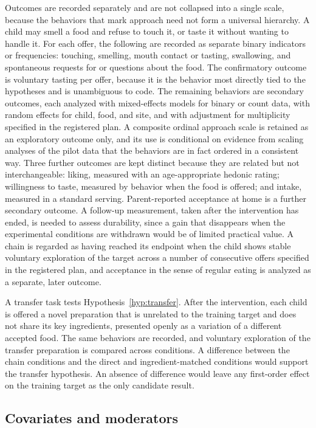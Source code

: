 \documentclass[11pt]{article}
\theoremstyle{remark}
\begin{document}
Outcomes are recorded separately and are not collapsed into a single scale, because the behaviors that mark approach need not form a universal hierarchy. A child may smell a food and refuse to touch it, or taste it without wanting to handle it. For each offer, the following are recorded as separate binary indicators or frequencies: touching, smelling, mouth contact or tasting, swallowing, and spontaneous requests for or questions about the food. The confirmatory outcome is voluntary tasting per offer, because it is the behavior most directly tied to the hypotheses and is unambiguous to code. The remaining behaviors are secondary outcomes, each analyzed with mixed-effects models for binary or count data, with random effects for child, food, and site, and with adjustment for multiplicity specified in the registered plan. A composite ordinal approach scale is retained as an exploratory outcome only, and its use is conditional on evidence from scaling analyses of the pilot data that the behaviors are in fact ordered in a consistent way. Three further outcomes are kept distinct because they are related but not interchangeable: liking, measured with an age-appropriate hedonic rating; willingness to taste, measured by behavior when the food is offered; and intake, measured in a standard serving. Parent-reported acceptance at home is a further secondary outcome. A follow-up measurement, taken after the intervention has ended, is needed to assess durability, since a gain that disappears when the experimental conditions are withdrawn would be of limited practical value. A chain is regarded as having reached its endpoint when the child shows stable voluntary exploration of the target across a number of consecutive offers specified in the registered plan, and acceptance in the sense of regular eating is analyzed as a separate, later outcome.

A transfer task tests Hypothesis~\ref{hyp:transfer}. After the intervention, each child is offered a novel preparation that is unrelated to the training target and does not share its key ingredients, presented openly as a variation of a different accepted food. The same behaviors are recorded, and voluntary exploration of the transfer preparation is compared across conditions. A difference between the chain conditions and the direct and ingredient-matched conditions would support the transfer hypothesis. An absence of difference would leave any first-order effect on the training target as the only candidate result.

\subsection{Covariates and moderators}
\end{document}
